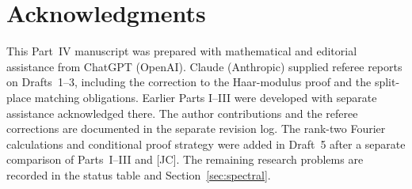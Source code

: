 \documentclass[11pt]{article}
\theoremstyle{plain}
\theoremstyle{definition}
\begin{document}
\section*{Acknowledgments}
This Part~IV manuscript was prepared with mathematical and editorial
assistance from ChatGPT (OpenAI).  Claude (Anthropic) supplied
referee reports on Drafts~1--3, including the correction to the
Haar-modulus proof and the split-place matching obligations.  Earlier Parts I--III were developed
with separate assistance acknowledged there.  The author contributions and the referee corrections are documented
in the separate revision log.  The rank-two Fourier calculations and
conditional proof strategy were added in Draft~5 after a separate
comparison of Parts~I--III and [JC].  The remaining research problems are
recorded in the status table and Section~\ref{sec:spectral}.
\end{document}
